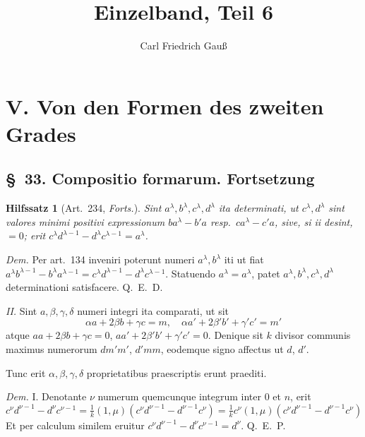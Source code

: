 \documentclass[12pt,a4paper]{article}
\title{Einzelband, Teil 6}
\author{Carl Friedrich Gau\ss}
\date{}
\theoremstyle{plain}
\newtheorem{hilfssatz}{Hilfssatz}[section]
\theoremstyle{definition}
\theoremstyle{remark}
\theoremstyle{problemstyle}
\begin{document}
\maketitle

\section*{V. Von den Formen des zweiten Grades}

\subsection*{\S\ 33. Compositio formarum. Fortsetzung}

\begin{hilfssatz}[Art.\ 234, \emph{Forts.}]
Sint $a^{\lambda}, b^{\lambda}, c^{\lambda}, d^{\lambda}$ ita determinati, ut $c^{\lambda}, d^{\lambda}$ sint valores minimi positivi expressionum $ba^{\lambda}-b'a$ resp.\ $ca^{\lambda}-c'a$, sive, si ii desint, $=0$; erit $c^{\lambda}d^{\lambda-1}-d^{\lambda}c^{\lambda-1}=a^{\lambda}$.
\end{hilfssatz}

\emph{Dem.} Per art.\ 134 inveniri poterunt numeri $a^{\lambda}, b^{\lambda}$ iti ut fiat $a^{\lambda}b^{\lambda-1}-b^{\lambda}a^{\lambda-1}=c^{\lambda}d^{\lambda-1}-d^{\lambda}c^{\lambda-1}$. Statuendo $a^{\lambda}=a^{\lambda}$, patet $a^{\lambda}, b^{\lambda}, c^{\lambda}, d^{\lambda}$ determinationi satisfacere. Q.\ E.\ D.

\emph{II.} Sint $a, \beta, \gamma, \delta$ numeri integri ita comparati, ut sit
\[
\alpha a + 2\beta b + \gamma c = m, \quad \alpha a' + 2\beta' b' + \gamma' c' = m'
\]
atque $aa + 2\beta b + \gamma c = 0$, $aa' + 2\beta' b' + \gamma' c' = 0$. Denique sit $k$ divisor communis maximus numerorum $dm'm'$, $d'mm$, eodemque signo affectus ut $d$, $d'$.

Tunc erit $\alpha, \beta, \gamma, \delta$ proprietatibus praescriptis erunt praediti.

\emph{Dem.} I. Denotante $\nu$ numerum quemcunque integrum inter $0$ et $n$, erit
\[
c^{\nu}d^{\nu-1} - d^{\nu}c^{\nu-1} = \tfrac{1}{k}(1,\mu)(c^{\nu}d^{\nu-1} - d^{\nu-1}c^{\nu}) = \tfrac{1}{k}c^{\nu}(1,\mu)(c^{\nu}d^{\nu-1} - d^{\nu-1}c^{\nu})
\]
Et per calculum similem eruitur $c^{\nu}d^{\nu-1} - d^{\nu}c^{\nu-1} = d^{\nu}$. Q.\ E.\ P.
\end{document}
